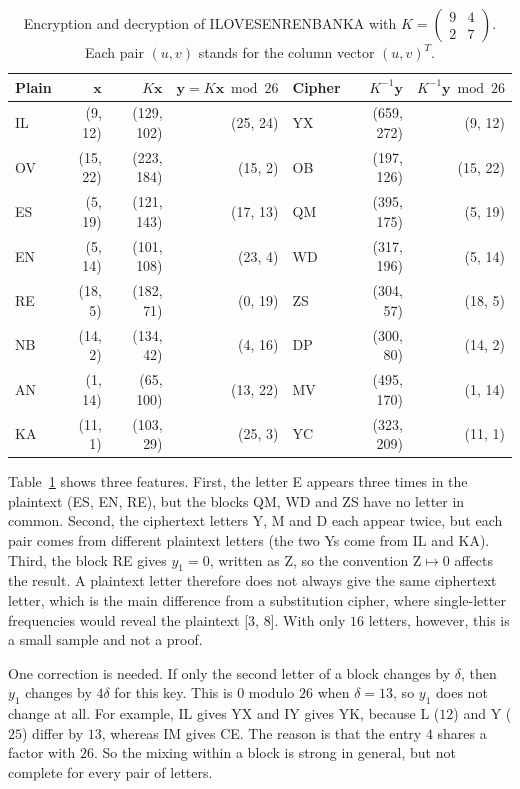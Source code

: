\documentclass[11pt,a4paper]{article}
\newcommand{\smat}[1]{\left(\begin{smallmatrix}#1\end{smallmatrix}\right)}
\newcommand{\x}{\mathbf{x}}   %
\newcommand{\y}{\mathbf{y}}   %
\theoremstyle{plain}
\theoremstyle{definition}
\begin{document}
\begin{table}[ht]
\centering
\small
\caption{Encryption and decryption of ILOVESENRENBANKA with $K=\smat{9&4\\2&7}$. Each pair $(u,v)$ stands for the column vector $(u,v)^T$.}
\label{tab:main}
\setlength{\tabcolsep}{6pt}
\begin{tabular}{l r r r l r r}
\toprule
Plain & $\x$ & $K\x$ & $\y=K\x\bmod26$ & Cipher & $K^{-1}\y$ & $K^{-1}\y\bmod26$\\
\midrule
IL & (9, 12)  & (129, 102) & (25, 24) & YX & (659, 272) & (9, 12)\\
OV & (15, 22) & (223, 184) & (15, 2)  & OB & (197, 126) & (15, 22)\\
ES & (5, 19)  & (121, 143) & (17, 13) & QM & (395, 175) & (5, 19)\\
EN & (5, 14)  & (101, 108) & (23, 4)  & WD & (317, 196) & (5, 14)\\
RE & (18, 5)  & (182, 71)  & (0, 19)  & ZS & (304, 57)  & (18, 5)\\
NB & (14, 2)  & (134, 42)  & (4, 16)  & DP & (300, 80)  & (14, 2)\\
AN & (1, 14)  & (65, 100)  & (13, 22) & MV & (495, 170) & (1, 14)\\
KA & (11, 1)  & (103, 29)  & (25, 3)  & YC & (323, 209) & (11, 1)\\
\bottomrule
\end{tabular}
\end{table}

Table~\ref{tab:main} shows three features. First, the letter E appears three times in the plaintext (ES, EN, RE), but the blocks QM, WD and ZS have no letter in common. Second, the ciphertext letters Y, M and D each appear twice, but each pair comes from different plaintext letters (the two Ys come from IL and KA). Third, the block RE gives $y_1=0$, written as Z, so the convention $\text{Z}\mapsto0$ affects the result. A plaintext letter therefore does not always give the same ciphertext letter, which is the main difference from a substitution cipher, where single-letter frequencies would reveal the plaintext [3, 8]. With only $16$ letters, however, this is a small sample and not a proof.

One correction is needed. If only the second letter of a block changes by $\delta$, then $y_1$ changes by $4\delta$ for this key. This is $0$ modulo $26$ when $\delta=13$, so $y_1$ does not change at all. For example, IL gives YX and IY gives YK, because L ($12$) and Y ($25$) differ by $13$, whereas IM gives CE. The reason is that the entry $4$ shares a factor with $26$. So the mixing within a block is strong in general, but not complete for every pair of letters.
\end{document}
